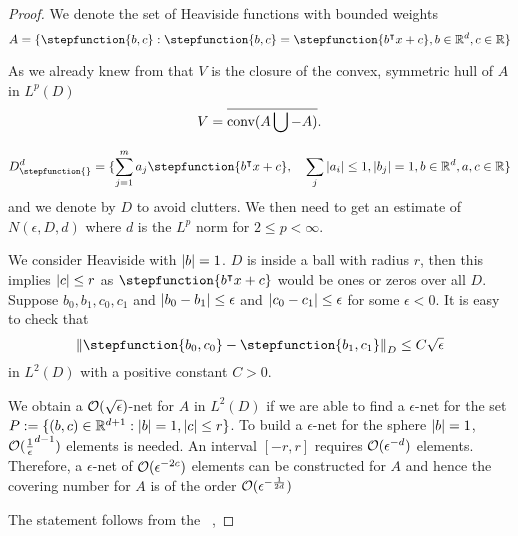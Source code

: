 \begin{proof}
    We denote the set of Heaviside functions with bounded weights
    \begin{equation}
        A = \{\stepfunction{b, c}: \stepfunction{b, c} = 
        \stepfunction{b\tr x + c}, b\in\R^d, c\in\R\}
    \end{equation}

    As we already knew from \cite{barronUniversalApproximationBounds1993} that
    $V$ is the closure of the convex, symmetric hull of $A$ in $L^p(D)$
    \begin{equation}
        V = \overline{\textrm{conv}(A \bigcup - A)}.
    \end{equation}

    \begin{equation}
        D^d_{\stepfunction{}} = \{\sum_{j=1}^m a_j \stepfunction{b\tr x + c}, 
        \quad \sum_j \abs{a_i} \leq 1, \abs{b_j} = 1,
        b\in\R^d,
        a, c\in\R\}
    \end{equation}
    and we denote by $D$ to avoid clutters. We then need to get an
    estimate of $N(\epsilon, D, d)$ where $d$ is the $L^p$ norm for $2 \leq p <
    \infty$.

    We consider Heaviside with $\left| b \right| = 1$. $D$ is inside a ball with radius
    $r$, then this implies $\left| c \right| \leq r$ as $\stepfunction{b\tr x + c}$ would
    be ones or zeros over all $D$. Suppose $b_0, b_1, c_0, c_1$ and $\left| b_0 -
    b_1 \right| \leq \epsilon$ and $\left| c_0 - c_1 \right| \leq \epsilon$ for some $\epsilon <
    0$. It is easy to check that 
    \begin{equation}
        \norm{\stepfunction{b_0, c_0} - \stepfunction{b_1, c_1}}_{D}
            \leq C \sqrt{\epsilon}
    \end{equation}
    in $L^2(D)$ with a positive constant $C>0$.
    
    We obtain a $\mathcal{O}(\sqrt{\epsilon})$-net for $A$ in $L^2(D)$ if we are able
    to find a $\epsilon$-net for the set $P:= \{(b,c)\in \mathbb{R}^{d+1}: \left| b \right| = 1,
    \left| c \right| \leq r\}$. To build a $\epsilon$-net for the sphere $\left| b \right|=1$,
    $\mathcal{O}(\frac{1}{\epsilon}^{d-1})$ elements is needed. An interval $[-r,r]$
    requires $\mathcal{O}(\epsilon^{-d})$ elements. Therefore, a $\epsilon$-net of
    $\mathcal{O}(\epsilon^{-2c})$ elements can be constructed for $A$ and hence the
    covering number for $A$ is of the order $\mathcal{O}(\epsilon^{-\frac{1}{2d}})$

    The statement follows from the ~\cite[Corollary, p.
    104]{makovozRandomApproximantsNeural1996}, 
\end{proof}


